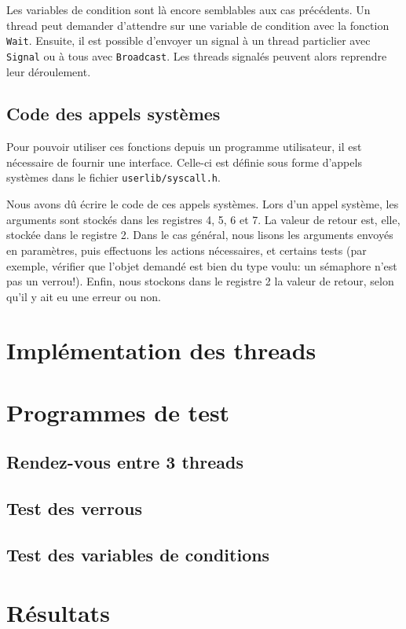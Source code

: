 \documentclass{article}
\def\file#1{\texttt{#1}}
\def\fun#1{\texttt{#1}}
\begin{document}
  Les variables de condition sont là encore semblables aux cas précédents. Un thread peut demander d'attendre sur une variable de condition avec la fonction \fun{Wait}. Ensuite, il est possible d'envoyer un signal à un thread particlier avec \fun{Signal} ou à tous avec \fun{Broadcast}. Les threads signalés peuvent alors reprendre leur déroulement.

\subsection{Code des appels systèmes}

  Pour pouvoir utiliser ces fonctions depuis un programme utilisateur, il est nécessaire de fournir une interface. Celle-ci est définie sous forme d'appels systèmes dans le fichier \file{userlib/syscall.h}.

  Nous avons dû écrire le code de ces appels systèmes. Lors d'un appel système, les arguments sont stockés dans les registres 4, 5, 6 et 7. La valeur de retour est, elle, stockée dans le registre 2.
  Dans le cas général, nous lisons les arguments envoyés en paramètres, puis effectuons les actions nécessaires, et certains tests (par exemple, vérifier que l'objet demandé est bien du type voulu: un sémaphore n'est pas un verrou!). Enfin, nous stockons dans le registre 2 la valeur de retour, selon qu'il y ait eu une erreur ou non.

\section{Implémentation des threads}

\section{Programmes de test}
\subsection{Rendez-vous entre 3 threads}
\subsection{Test des verrous}
\subsection{Test des variables de conditions}

\section{Résultats}
\end{document}
